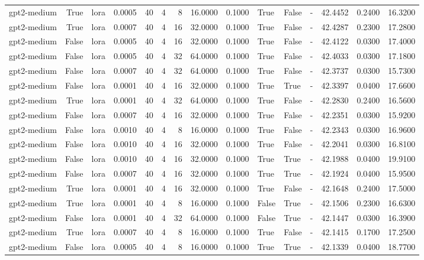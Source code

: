 \begin{tabular}{lrlrrrrrrlllrrr}
gpt2-medium & True & lora & 0.0005 & 40 & 4 & 8 & 16.0000 & 0.1000 & True & False & - & 42.4452 & 0.2400 & 16.3200 \\
gpt2-medium & True & lora & 0.0007 & 40 & 4 & 16 & 32.0000 & 0.1000 & True & False & - & 42.4287 & 0.2300 & 17.2800 \\
gpt2-medium & False & lora & 0.0005 & 40 & 4 & 16 & 32.0000 & 0.1000 & True & False & - & 42.4122 & 0.0300 & 17.4000 \\
gpt2-medium & False & lora & 0.0005 & 40 & 4 & 32 & 64.0000 & 0.1000 & True & False & - & 42.4033 & 0.0300 & 17.1800 \\
gpt2-medium & False & lora & 0.0007 & 40 & 4 & 32 & 64.0000 & 0.1000 & True & False & - & 42.3737 & 0.0300 & 15.7300 \\
gpt2-medium & False & lora & 0.0001 & 40 & 4 & 16 & 32.0000 & 0.1000 & True & True & - & 42.3397 & 0.0400 & 17.6600 \\
gpt2-medium & True & lora & 0.0001 & 40 & 4 & 32 & 64.0000 & 0.1000 & True & False & - & 42.2830 & 0.2400 & 16.5600 \\
gpt2-medium & False & lora & 0.0007 & 40 & 4 & 16 & 32.0000 & 0.1000 & True & False & - & 42.2351 & 0.0300 & 15.9200 \\
gpt2-medium & False & lora & 0.0010 & 40 & 4 & 8 & 16.0000 & 0.1000 & True & False & - & 42.2343 & 0.0300 & 16.9600 \\
gpt2-medium & False & lora & 0.0010 & 40 & 4 & 16 & 32.0000 & 0.1000 & True & False & - & 42.2041 & 0.0300 & 16.8100 \\
gpt2-medium & False & lora & 0.0010 & 40 & 4 & 16 & 32.0000 & 0.1000 & True & True & - & 42.1988 & 0.0400 & 19.9100 \\
gpt2-medium & False & lora & 0.0007 & 40 & 4 & 16 & 32.0000 & 0.1000 & True & True & - & 42.1924 & 0.0400 & 15.9500 \\
gpt2-medium & True & lora & 0.0001 & 40 & 4 & 16 & 32.0000 & 0.1000 & True & False & - & 42.1648 & 0.2400 & 17.5000 \\
gpt2-medium & True & lora & 0.0001 & 40 & 4 & 8 & 16.0000 & 0.1000 & False & True & - & 42.1506 & 0.2300 & 16.6300 \\
gpt2-medium & False & lora & 0.0001 & 40 & 4 & 32 & 64.0000 & 0.1000 & False & True & - & 42.1447 & 0.0300 & 16.3900 \\
gpt2-medium & True & lora & 0.0007 & 40 & 4 & 8 & 16.0000 & 0.1000 & True & False & - & 42.1415 & 0.1700 & 17.2500 \\
gpt2-medium & False & lora & 0.0005 & 40 & 4 & 8 & 16.0000 & 0.1000 & True & True & - & 42.1339 & 0.0400 & 18.7700 \\

\end{tabular}
